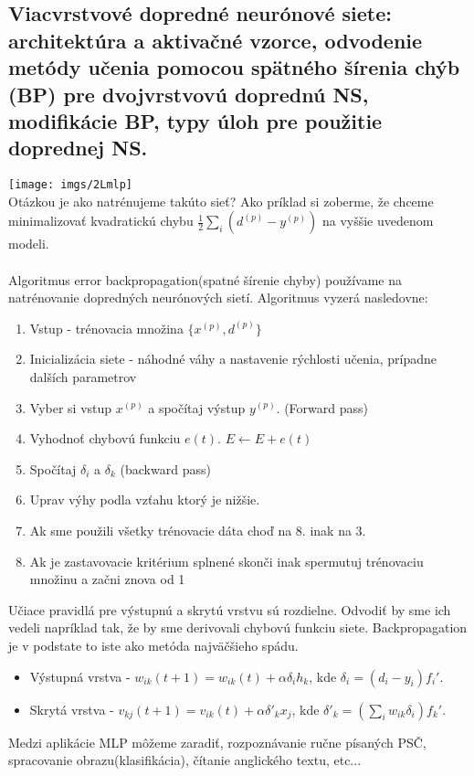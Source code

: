 \documentclass{article}
\numberwithin{equation}{section} %
\begin{document}
\subsection{Viacvrstvové dopredné neurónové siete: architektúra a aktivačné vzorce, odvodenie metódy učenia pomocou spätného šírenia chýb (BP) pre dvojvrstvovú doprednú NS, modifikácie BP, typy úloh pre použitie doprednej NS.}
\texttt{[image: imgs/2Lmlp]}\\
Otázkou je ako natrénujeme takúto sieť? Ako príklad si zoberme, že chceme minimalizovať kvadratickú chybu $\frac{1}{2}\sum_i(d^{(p)} - y^{(p)})$ na vyššie uvedenom modeli. 
\\\\
Algoritmus error backpropagation(spatné šírenie chyby) používame na natrénovanie dopredných neurónových sietí. Algoritmus vyzerá nasledovne:\\
\begin{enumerate}
\item Vstup - trénovacia množina $\{x^{(p)}, d^{(p)}\}$
\item Inicializácia siete - náhodné váhy a nastavenie rýchlosti učenia, prípadne dalších parametrov
\item Vyber si vstup $x^{(p)}$ a spočítaj výstup $y^{(p)}$. (Forward pass)
\item Vyhodnoť chybovú funkciu $e(t)$.  $E \leftarrow E + e(t)$
\item Spočítaj $\delta_i$ a $\delta_k$ (backward pass)
\item Uprav výhy podla vzťahu ktorý je nižšie.
\item Ak sme použili všetky trénovacie dáta choď na 8. inak na 3.
\item Ak je zastavovacie kritérium splnené	skonči inak spermutuj trénovaciu množinu a začni znova od 1
\end{enumerate}
Učiace pravidlá pre výstupnú a skrytú vrstvu sú rozdielne. Odvodiť by sme ich vedeli napríklad tak, že by sme derivovali chybovú funkciu siete. Backpropagation je v podstate to iste ako metóda najväčšieho spádu.
\begin{itemize}
\item Výstupná vrstva - $ w_{ik}(t+1) = w_{ik}(t) + \alpha\delta_ih_k $, kde $\delta_i = (d_i - y_i)f_i'$.
\item Skrytá vrstva - $ v_{kj}(t+1) = v_{ik}(t) + \alpha\delta'_kx_j $, kde $\delta'_k = (\sum_iw_{ik}\delta_i)f_k'$.
\end{itemize}
Medzi aplikácie MLP môžeme zaradiť, rozpoznávanie ručne písaných PSČ, spracovanie obrazu(klasifikácia), čítanie anglického textu, etc...
\end{document}
